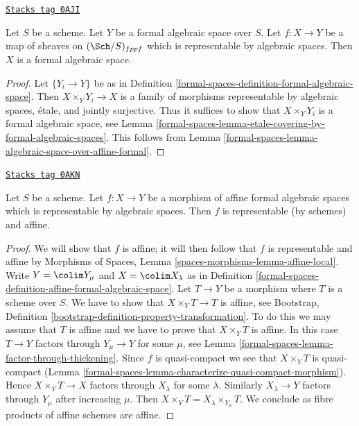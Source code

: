 \begin{lemma}
\label{formal-spaces-lemma-representable-by-algebraic-spaces}
\href{https://stacks.math.columbia.edu/tag/0AJI}{\texttt{Stacks tag 0AJI}}

Let $S$ be a scheme. Let $Y$ be a formal algebraic space over $S$.
Let $f : X \to Y$ be a map of sheaves on $(\Sch/S)_{fppf}$ which is
representable by algebraic spaces. Then $X$ is a formal
algebraic space.
\end{lemma}

\begin{proof}
Let $\{Y_i \to Y\}$ be as in
Definition \ref{formal-spaces-definition-formal-algebraic-space}.
Then $X \times_Y Y_i \to X$ is a family of morphisms
representable by algebraic spaces, \'etale, and jointly
surjective. Thus it suffices to show that
$X \times_Y Y_i$ is a formal algebraic space, see
Lemma \ref{formal-spaces-lemma-etale-covering-by-formal-algebraic-spaces}.
This follows from Lemma \ref{formal-spaces-lemma-algebraic-space-over-affine-formal}.
\end{proof}

\begin{lemma}
\label{formal-spaces-lemma-affine-representable-by-algebraic-spaces}
\href{https://stacks.math.columbia.edu/tag/0AKN}{\texttt{Stacks tag 0AKN}}

Let $S$ be a scheme. Let $f : X \to Y$ be a morphism of
affine formal algebraic spaces which is representable by
algebraic spaces. Then $f$ is representable (by schemes) and affine.
\end{lemma}

\begin{proof}
We will show that $f$ is affine; it will then follow that
$f$ is representable and affine by
Morphisms of Spaces, Lemma \ref{spaces-morphisms-lemma-affine-local}.
Write $Y = \colim Y_\mu$ and $X = \colim X_\lambda$ as in
Definition \ref{formal-spaces-definition-affine-formal-algebraic-space}.
Let $T \to Y$ be a morphism where $T$ is a scheme
over $S$. We have to show that $X \times_Y T \to T$ is affine, see
Bootstrap, Definition
\ref{bootstrap-definition-property-transformation}.
To do this we may assume that $T$ is affine and we have to prove
that $X \times_Y T$ is affine. In this case $T \to Y$ factors
through $Y_\mu \to Y$ for some $\mu$, see
Lemma \ref{formal-spaces-lemma-factor-through-thickening}.
Since $f$ is quasi-compact we see that $X \times_Y T$ is
quasi-compact (Lemma \ref{formal-spaces-lemma-characterize-quasi-compact-morphism}).
Hence $X \times_Y T \to X$ factors through $X_\lambda$ for some
$\lambda$. Similarly $X_\lambda \to Y$ factors through $Y_\mu$
after increasing $\mu$. Then
$X \times_Y T = X_\lambda \times_{Y_\mu} T$.
We conclude as fibre products of affine schemes are affine.
\end{proof}

